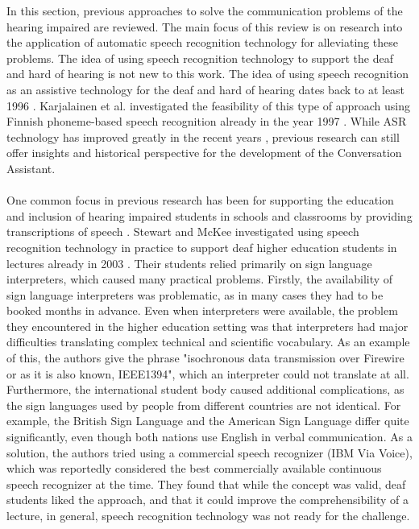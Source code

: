 \documentclass[english, 12pt, a4paper, pdftex, elec, utf8]{aaltothesis}
\begin{document}
In this section, previous approaches to solve the communication problems of the hearing impaired are reviewed. The main focus of this review is on research into the application of automatic speech recognition technology for alleviating these problems. The idea of using speech recognition technology to support the deaf and hard of hearing is not new to this work. The idea of using speech recognition as an assistive technology for the deaf and hard of hearing dates back to at least 1996 \cite{robison1996computer}. Karjalainen et al. investigated the feasibility of this type of approach using Finnish phoneme-based speech recognition already in the year 1997 \cite{karjalainen1997applications}. While ASR technology has improved greatly in the recent years \cite{yu2014automatic}, previous research can still offer insights and historical perspective for the development of the Conversation Assistant. \\\\
One common focus in previous research has been for supporting the education and inclusion of hearing impaired students in schools and classrooms by providing transcriptions of speech \cite{kheir2007inclusion, stewart2003application, fen2010using, jun2010exploration, jimenez2011tablet, ranchal2013using, kawas2016improving}. Stewart and McKee investigated using speech recognition technology in practice to support deaf higher education students in lectures already in 2003 \cite{stewart2003application}. Their students relied primarily on sign language interpreters, which caused many practical problems. Firstly, the availability of sign language interpreters was problematic, as in many cases they had to be booked months in advance. Even when interpreters were available, the problem they encountered in the higher education setting was that interpreters had major difficulties translating complex technical and scientific vocabulary. As an example of this, the authors give the phrase "isochronous data transmission over Firewire or as it is also known, IEEE1394", which an interpreter could not translate at all. Furthermore, the international student body caused additional complications, as the sign languages used by people from different countries are not identical. For example, the British Sign Language and the American Sign Language differ quite significantly, even though both nations use English in verbal communication. As a solution, the authors tried using a commercial speech recognizer (IBM Via Voice), which was reportedly considered the best commercially available continuous speech recognizer at the time. They found that while the concept was valid, deaf students liked the approach, and that it could improve the comprehensibility of a lecture, in general, speech recognition technology was not ready for the challenge. \\\\
\end{document}
